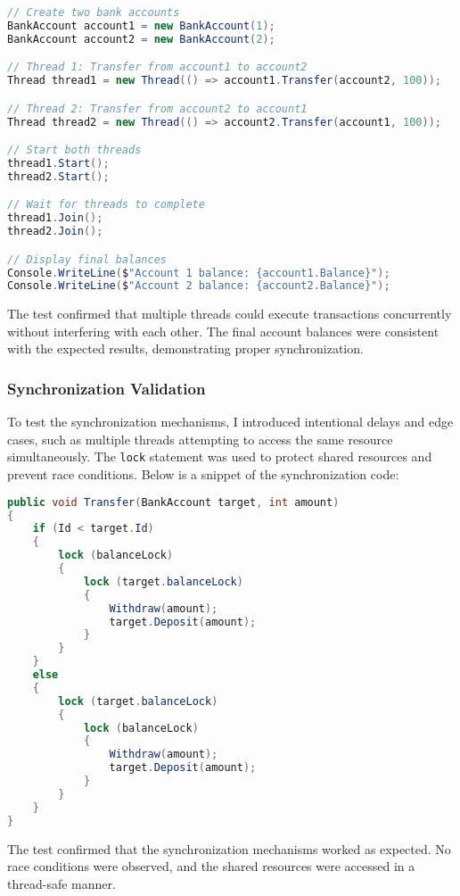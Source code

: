 \documentclass{article}
\begin{document}
\begin{lstlisting}[language=C#]
// Create two bank accounts
BankAccount account1 = new BankAccount(1);
BankAccount account2 = new BankAccount(2);

// Thread 1: Transfer from account1 to account2
Thread thread1 = new Thread(() => account1.Transfer(account2, 100));

// Thread 2: Transfer from account2 to account1
Thread thread2 = new Thread(() => account2.Transfer(account1, 100));

// Start both threads
thread1.Start();
thread2.Start();

// Wait for threads to complete
thread1.Join();
thread2.Join();

// Display final balances
Console.WriteLine($"Account 1 balance: {account1.Balance}");
Console.WriteLine($"Account 2 balance: {account2.Balance}");
\end{lstlisting}

The test confirmed that multiple threads could execute transactions concurrently without interfering with each other. The final account balances were consistent with the expected results, demonstrating proper synchronization.

\subsubsection*{Synchronization Validation}
To test the synchronization mechanisms, I introduced intentional delays and edge cases, such as multiple threads attempting to access the same resource simultaneously. The \texttt{lock} statement was used to protect shared resources and prevent race conditions. Below is a snippet of the synchronization code:

\begin{lstlisting}[language=C#]
public void Transfer(BankAccount target, int amount)
{
    if (Id < target.Id)
    {
        lock (balanceLock)
        {
            lock (target.balanceLock)
            {
                Withdraw(amount);
                target.Deposit(amount);
            }
        }
    }
    else
    {
        lock (target.balanceLock)
        {
            lock (balanceLock)
            {
                Withdraw(amount);
                target.Deposit(amount);
            }
        }
    }
}
\end{lstlisting}

The test confirmed that the synchronization mechanisms worked as expected. No race conditions were observed, and the shared resources were accessed in a thread-safe manner.
\end{document}

